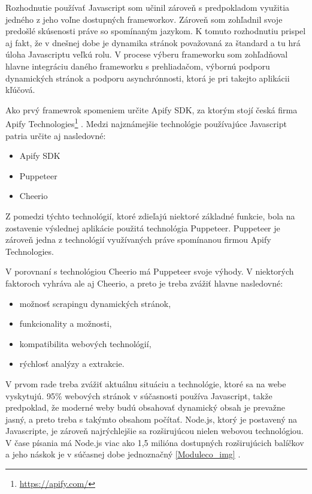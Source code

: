 \bigskip

Rozhodnutie používať Javascript som učinil zároveň s predpokladom využitia jedného z jeho voľne dostupných frameworkov. Zároveň som zohľadnil svoje predošlé skúsenosti práve so spomínaným jazykom. K tomuto rozhodnutiu prispel aj fakt, že v dnešnej dobe je dynamika stránok považovaná za štandard a tu hrá úloha Javascriptu veľkú rolu. V procese výberu frameworku som zohľadňoval hlavne integráciu daného frameworku s prehliadačom, výbornú podporu dynamických stránok a podporu asynchrónnosti, ktorá je pri takejto aplikácii kľúčová.

Ako prvý framewrok spomeniem určite Apify SDK, za ktorým stojí česká firma Apify Technologies\footnote{{\url{https://apify.com/}}} \cite{JanCurna:online}. Medzi najznámejšie technológie používajúce Javascript patria určite aj nasledovné:

\begin{itemize}
    \item {Apify SDK}
    \item {Puppeteer}
    \item {Cheerio}
\end{itemize}

Z pomedzi týchto technológií, ktoré zdieľajú niektoré základné funkcie, bola na zostavenie výslednej aplikácie použitá technológia Puppeteer. Puppeteer je zároveň jedna z technológií využívaných práve spomínanou firmou Apify Technologies. 

V porovnaní s technológiou Cheerio má Puppeteer svoje výhody. V niektorých faktoroch vyhráva ale aj Cheerio, a preto je treba zvážiť hlavne nasledovné:

\begin{itemize}
    \item možnosť scrapingu dynamických stránok,
    \item funkcionality a možnosti,
    \item kompatibilita webových technológií,
    \item rýchlosť analýzy a extrakcie.
\end{itemize}

V prvom rade treba zvážiť aktuálnu situáciu a technológie, ktoré sa na webe vyskytujú. 95\% webových stránok v súčasnosti používa Javascript, takže predpoklad, že moderné weby budú obsahovať dynamický obsah je prevažne jasný, a preto treba s takýmto obsahom počítať. Node.js, ktorý je postavený na Javascripte, je zároveň najrýchlejšie sa rozširujúcou nielen webovou technológiou. V čase písania má Node.js viac ako 1,5 milióna dostupných rozširujúcich balíčkov a jeho náskok je v súčasnej dobe jednoznačný \ref{Moduleco_img} \cite{HowPopular}. 

